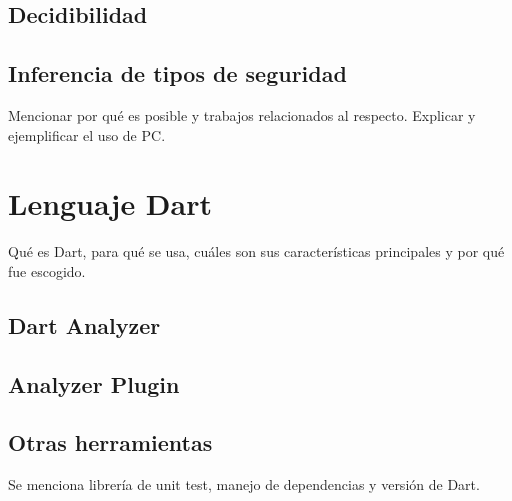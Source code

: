 \subsection{Decidibilidad}

\subsection{Inferencia de tipos de seguridad}
Mencionar por qué es posible y trabajos relacionados al respecto. Explicar y ejemplificar el uso de PC.

\section{Lenguaje Dart}
Qué es Dart, para qué se usa, cuáles son sus características principales y por qué fue escogido.
\subsection{Dart Analyzer}
\subsection{Analyzer Plugin}
\subsection{Otras herramientas}
Se menciona librería de unit test, manejo de dependencias y versión de Dart.
